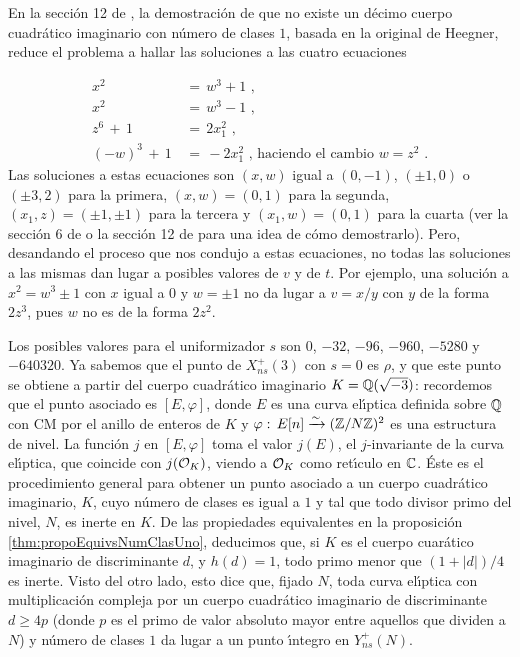 En la secci\'{o}n 12 de \cite{cox}, la demostraci\'{o}n de que no existe un d\'{e}cimo cuerpo
cuadr\'{a}tico imaginario con n\'{u}mero de clases $1$, basada en la original de
Heegner, reduce el problema a hallar las soluciones a las cuatro ecuaciones

\begin{align*}
x^{2} & \,=\,w^{3}+1\text{ ,}\\
x^{2} &\,=\,w^{3}-1\text{ ,}\\
z^{6}\,+\,1 &\,=\,2x_{1}^{2}\text{ ,}\\
(-w)^{3}\,+\,1 &\,=\,-2x_{1}^{2}\text{ , haciendo el cambio } w=z^{2}\text{ .}
\end{align*}
Las soluciones a estas ecuaciones son
$(x,w)$ igual a $(0,-1)$, $(\pm 1,0)$ o $(\pm 3,2)$ para la primera,
$(x,w)=(0,1)$ para la segunda, $(x_{1},z)=(\pm1,\pm1)$ para la tercera y
$(x_{1},w)=(0,1)$ para la cuarta (ver la secci\'{o}n 6 de \cite{booher} o
la secci\'{o}n 12 de \cite{cox} para una idea de c\'{o}mo demostrarlo).
Pero, desandando el proceso que nos condujo a
estas ecuaciones, no todas las soluciones a las mismas dan lugar a posibles
valores de $v$ y de $t$. Por ejemplo, una soluci\'{o}n a $x^{2}=w^{3}\pm 1$ con
$x$ igual a $0$ y $w=\pm 1$ no da lugar a $v=x/y$ con $y$ de la forma $2z^{3}$,
pues $w$ no es de la forma $2z^{2}$.

Los posibles valores para el uniformizador $s$ son $0$, $-32$, $-96$, $-960$,
$-5280$ y $-640320$. Ya sabemos que el punto de $X_{ns}^{+}(3)$ con $s=0$ es
$\rho$, y que este punto se obtiene a partir del cuerpo cuadr\'{a}tico imaginario
$K=\bb{Q}(\sqrt{-3})$: recordemos que el punto asociado es $[E,\varphi]$,
donde $E$ es una curva el\'{\i}ptica definida sobre $\bb{Q}$ con CM por el anillo
de enteros de $K$ y $\varphi:\,E[n]\xrightarrow{\sim}(\bb{Z}/N\bb{Z})^{2}$ es una
estructura de nivel. La funci\'{o}n $j$ en $[E,\varphi]$ toma el valor $j(E)$,
el $j$-invariante de la curva el\'{\i}ptica, que coincide con $j(\cal{O}_{K})$,
viendo a $\cal{O}_{K}$ como ret\'{\i}culo en $\bb{C}$. \'{E}ste es el procedimiento
general para obtener un punto asociado a un cuerpo cuadr\'{a}tico imaginario, $K$,
cuyo n\'{u}mero de clases es igual a $1$ y tal que todo divisor primo del nivel,
$N$, es inerte en $K$. De las propiedades equivalentes
en la proposici\'{o}n \ref{thm:propoEquivsNumClasUno},
%
deducimos que, si $K$ es el cuerpo cuar\'{a}tico imaginario de discriminante $d$,
y $h(d)=1$, todo primo menor que $(1+|d|)/4$ es inerte.
Visto del otro lado, esto dice que, fijado $N$, toda curva el\'{\i}ptica con
multiplicaci\'{o}n compleja por un cuerpo cuadr\'{a}tico imaginario de
discriminante $d\geq 4p$ (donde $p$ es el primo de valor absoluto mayor entre
aquellos que dividen a $N$) y n\'{u}mero de clases $1$ da lugar a un punto
\'{\i}ntegro en $Y_{ns}^{+}(N)$.

